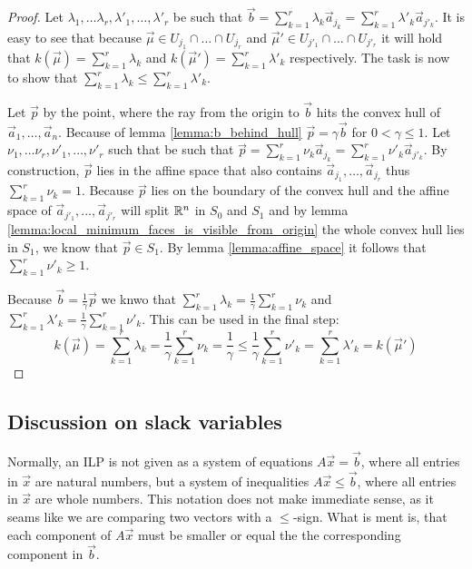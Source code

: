 \begin{proof}
    Let $\lambda_1, \dots \lambda_r, \lambda'_1, \dots, \lambda'_r$ be such that $\vec b = \sum_{k=1}^{r}\lambda_k \vec a_{j_k} = \sum_{k=1}^{r}\lambda'_k \vec a_{j'_k}$. It is easy to see that because $\vec\mu \in U_{j_1} \cap \dots \cap U_{j_r}$ and $\vec\mu' \in U_{j'_1} \cap \dots \cap U_{j'_r}$ it will hold that $k(\vec\mu) = \sum_{k=1}^{r}\lambda_k$ and $k(\vec\mu') = \sum_{k=1}^{r}\lambda'_k$ respectively. The task is now to show that $\sum_{k=1}^{r}\lambda_k \leq \sum_{k=1}^{r}\lambda'_k$.

    Let $\vec p$ by the point, where the ray from the origin to $\vec b$ hits the convex hull of $\vec a_1, \dots, \vec a_n$. Because of lemma \ref{lemma:b_behind_hull} $\vec p = \gamma\vec b$ for $0 < \gamma \leq 1$. Let $\nu_1, \dots \nu_r, \nu'_1, \dots, \nu'_r$ such that be such that $\vec p = \sum_{k=1}^{r}\nu_k \vec a_{j_k} = \sum_{k=1}^{r}\nu'_k \vec a_{j'_k}$. By construction, $\vec p$ lies in the affine space that also contains $\vec a_{j_1}, \dots, \vec a_{j_r}$ thus $\sum_{k=1}^{r}\nu_k = 1$. Because $\vec p$ lies on the boundary of the convex hull and the affine space of $\vec a_{j'_1}, \dots, \vec a_{j'_r}$ will split $\mathbb{R}^n$ in $S_0$ and $S_1$ and by lemma \ref{lemma:local_minimum_faces_is_visible_from_origin} the whole convex hull lies in $S_1$, we know that $\vec p\in S_1$. By lemma \ref{lemma:affine_space} it follows that $\sum_{k=1}^{r}\nu'_k \geq 1$.

    Because $\vec b = \frac{1}{\gamma}\vec p$ we knwo that $\sum_{k=1}^{r}\lambda_k = \frac{1}{\gamma} \sum_{k=1}^{r}\nu_k$ and $\sum_{k=1}^{r}\lambda'_k = \frac{1}{\gamma} \sum_{k=1}^{r}\nu'_k$. This can be used in the final step:
    $$k(\vec\mu) = \sum_{k=1}^{r}\lambda_k = \frac{1}{\gamma} \sum_{k=1}^{r}\nu_k = \frac{1}{\gamma} \leq \frac{1}{\gamma} \sum_{k=1}^{r}\nu'_k = \sum_{k=1}^{r}\lambda'_k = k(\vec\mu')$$
\end{proof}


\subsection{Discussion on slack variables}
Normally, an ILP is not given as a system of equations $A\vec x = \vec b$, where all entries in $\vec x$ are natural numbers, but a system of inequalities $A\vec x \leq \vec b$, where all entries in $\vec x$ are whole numbers. This notation does not make immediate sense, as it seams like we are comparing two vectors with a $\leq$-sign. What is ment is, that each component of $A\vec x$ must be smaller or equal the the corresponding component in $\vec b$. 

